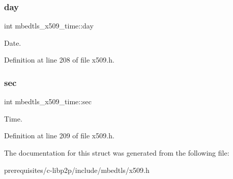 \subsubsection{\texorpdfstring{day}{day}}
{\footnotesize\ttfamily int mbedtls\+\_\+x509\+\_\+time\+::day}

Date. 

Definition at line 208 of file x509.\+h.

\mbox{\label{structmbedtls__x509__time_a267d51d8fbecde50b06b883db7f98ec2}} 
\subsubsection{\texorpdfstring{sec}{sec}}
{\footnotesize\ttfamily int mbedtls\+\_\+x509\+\_\+time\+::sec}

Time. 

Definition at line 209 of file x509.\+h.



The documentation for this struct was generated from the following file\+:\begin{DoxyCompactItemize}
\item 
prerequisites/c-\/libp2p/include/mbedtls/x509.\+h\end{DoxyCompactItemize}

